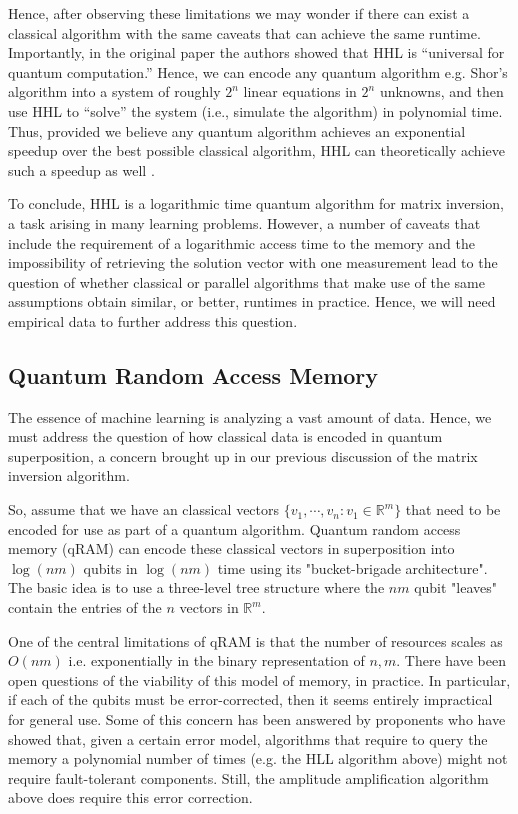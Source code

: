 \documentclass[12]{amsart}
\newcommand\0{\mathbf{0}}
\newcommand\RR{\mathbb{R}}
\newcommand\<{\langle}
\renewcommand\>{\rangle}
\begin{document}
Hence, after observing these limitations we may wonder if there can exist a classical algorithm with the same caveats that can achieve the same runtime. Importantly, in the original paper the authors showed that HHL is “universal for quantum computation.” Hence, we can encode any quantum algorithm e.g. Shor's algorithm into a system of roughly $2^n$ linear equations in $2^n$ unknowns, and then use HHL to “solve” the system (i.e., simulate the algorithm) in polynomial time. Thus, provided we believe any quantum algorithm achieves an exponential speedup over the best possible classical algorithm, HHL can theoretically achieve such a speedup as well \cite{aaronson2015read}.

To conclude, HHL is a logarithmic time quantum algorithm for matrix inversion, a task arising in many learning problems. However, a number of caveats that include the requirement of a logarithmic access time to the memory and the impossibility of retrieving the solution vector with one measurement lead to the question of whether classical or parallel algorithms that make use of the same assumptions obtain similar, or better, runtimes in practice. Hence, we will need empirical data to further address this question.

\subsection{Quantum Random Access Memory} 

The essence of machine learning is analyzing a vast amount of data. Hence, we must address the question of how classical data is encoded in quantum superposition, a concern brought up in our previous discussion of the matrix inversion algorithm. 

So, assume that we have an classical vectors $\{v_1, \cdots , v_ n : v_1 \in \RR^m \}$ that need to be encoded for use as part of a quantum algorithm. Quantum random access memory (qRAM) can encode these classical vectors in superposition into $\log(nm)$ qubits in $\log(nm)$ time using its "bucket-brigade architecture"\cite{giovannetti2008quantum}. The basic idea is to use a three-level tree structure where the $nm$ qubit "leaves" contain the entries of the $n$ vectors in $\RR^m$.

One of the central limitations of qRAM is that the number of resources scales as $O(nm)$ i.e. exponentially in the binary representation of $n, m$. There have been open questions of the viability of this model of memory, in practice. In particular, if each of the qubits must be error-corrected, then it seems entirely impractical for general use. Some of this concern has been answered by proponents who have showed that, given a certain error model, algorithms that require to query the memory a polynomial number of times (e.g. the HLL algorithm above) might not require fault-tolerant components. Still, the amplitude amplification algorithm above does require this error correction. 
\end{document}
